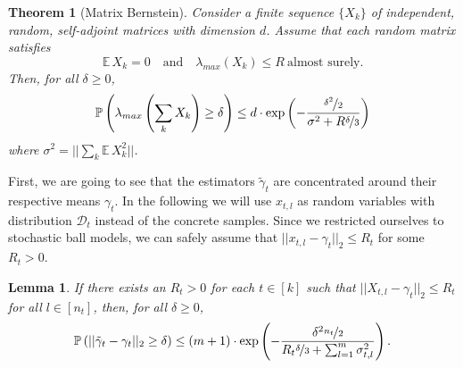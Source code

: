 \documentclass[10pt,a4paper]{article}
\newtheorem{theorem}{Theorem}
\newtheorem{lemma}{Lemma}
\begin{document}
\vspace{.5em}
\begin{theorem}[Matrix Bernstein]
  \label{thm:matrix-bernstein}
  Consider a finite sequence $\{ X_{k} \}$ of independent, random, self-adjoint matrices with dimension $d$.
  Assume that each random matrix satisfies
  \begin{equation*}
    \mathbb{E}\,X_{k} = 0 \quad \text{and} \quad \lambda_{max}(X_{k}) \le R\ \text{almost surely.}
  \end{equation*}
  Then, for all $\delta \ge 0$,
  \begin{equation*}
    \mathbb{P}\left( \lambda_{max}\left( \sum_{k} X_{k} \right) \ge \delta \right) \le d \cdot \exp\left( -\frac{\nicefrac{\delta^{2}}{2}}{\sigma^{2} + R \nicefrac{\delta}{3}} \right)
  \end{equation*}
  where $\sigma^{2} = ||\sum_{k} \mathbb{E}\,X_{k}^{2}||$.
\end{theorem}

First, we are going to see that the estimators $\tilde{\gamma}_{t}$ are concentrated around their respective means $\gamma_{t}$.
In the following we will use $x_{t, l}$ as random variables with distribution $\mathcal{D}_{t}$ instead of the concrete samples.
Since we restricted ourselves to stochastic ball models, we can safely assume that $||x_{t, l} - \gamma_{t}||_{2} \le R_{t}$ for some $R_{t} > 0$.

\vspace{.5em}
\begin{lemma}
  \label{lemma:concentration}
  If there exists an $R_{t} > 0$ for each $t \in [k]$ such that $||X_{t, l} - \gamma_{t}||_{2} \le R_{t}$ for all $l \in [n_{t}]$, then, for all $\delta \ge 0$,
  \begin{equation*}
    \mathbb{P}\left( ||\tilde{\gamma}_{t} - \gamma_{t}||_{2} \ge \delta \right) \le (m + 1) \cdot \exp\left( -\frac{\delta^{2} \nicefrac{n_{t}}{2}}{R_{t} \nicefrac{\delta}{3} + \sum_{l = 1}^{m} \sigma_{t, l}^{2}} \right).
  \end{equation*}
\end{lemma}
\end{document}
